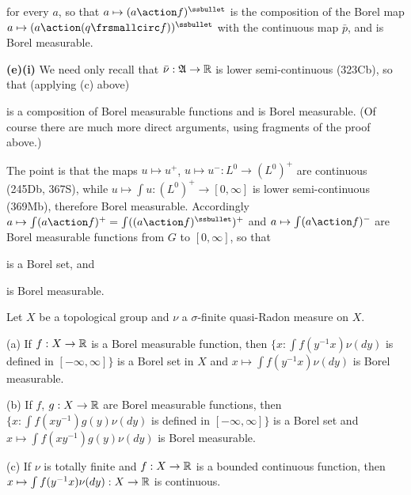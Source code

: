 {

\noindent for every $a$, so that $a\mapsto (a\action f)^{\ssbullet}$ is
the composition of the Borel map
$a\mapsto(a\action(q\frsmallcirc f))^{\ssbullet}$ with the
continuous map $\bar p$, and is Borel measurable.

\medskip

{\bf (e)(i)} We need only recall that $\bar\nu:\frak A\to\Bbb R$ is
lower semi-continuous (323Cb), so that (applying (c) above)


\noindent is a composition of Borel measurable functions and is Borel
measurable.   (Of course there are
much more direct arguments, using fragments of the proof above.)

\medskip

 The point is that the maps $u\mapsto u^+$,
$u\mapsto u^-:L^0\to(L^0)^+$ are continuous (245Db, 367S), while
$u\mapsto\int u:(L^0)^+\to[0,\infty]$ is lower semi-continuous
(369Mb), therefore Borel measurable.   Accordingly
$a\mapsto\int (a\action f)^+=\int((a\action f)^{\ssbullet})^+$ and
$a\mapsto\int (a\action f)^-$ are Borel measurable functions from $G$ to
$[0,\infty]$, so that


\noindent is a Borel set, and


\noindent is Borel measurable.
}%

 Let $X$ be a topological group and $\nu$ a
$\sigma$-finite quasi-Radon measure on $X$.

(a) If $f:X\to\Bbb R$ is a Borel measurable function, then
$\{x:\int f(y^{-1}x)\nu(dy)$ is defined in $[-\infty,\infty]\}$ is a
Borel set in
$X$ and $x\mapsto\int f(y^{-1}x)\nu(dy)$ is Borel measurable.

(b) If $f$, $g:X\to\Bbb R$ are Borel measurable functions, then
$\{x:\int f(xy^{-1})g(y)\nu(dy)$ is defined in $[-\infty,\infty]\}$ is a
Borel set and $x\mapsto\int f(xy^{-1})g(y)\nu(dy)$ is Borel measurable.

(c) If $\nu$ is totally finite and $f:X\to\Bbb R$ is a bounded
continuous function, then $x\mapsto\int f(y^{-1}x)\nu(dy):X\to\Bbb R$ is
continuous.

